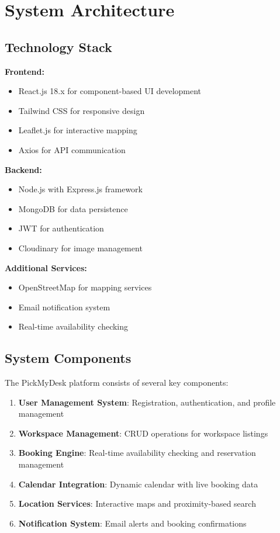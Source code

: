 \documentclass[12pt,a4paper]{article}
\begin{document}
\section{System Architecture}

\subsection{Technology Stack}

\textbf{Frontend:}
\begin{itemize}
    \item React.js 18.x for component-based UI development
    \item Tailwind CSS for responsive design
    \item Leaflet.js for interactive mapping
    \item Axios for API communication
\end{itemize}

\textbf{Backend:}
\begin{itemize}
    \item Node.js with Express.js framework
    \item MongoDB for data persistence
    \item JWT for authentication
    \item Cloudinary for image management
\end{itemize}

\textbf{Additional Services:}
\begin{itemize}
    \item OpenStreetMap for mapping services
    \item Email notification system
    \item Real-time availability checking
\end{itemize}

\subsection{System Components}

The PickMyDesk platform consists of several key components:

\begin{enumerate}
    \item \textbf{User Management System}: Registration, authentication, and profile management
    \item \textbf{Workspace Management}: CRUD operations for workspace listings
    \item \textbf{Booking Engine}: Real-time availability checking and reservation management
    \item \textbf{Calendar Integration}: Dynamic calendar with live booking data
    \item \textbf{Location Services}: Interactive maps and proximity-based search
    \item \textbf{Notification System}: Email alerts and booking confirmations
\end{enumerate}
\end{document}
